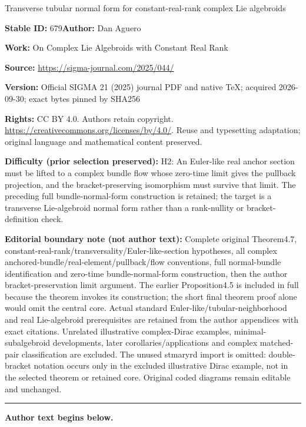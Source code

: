 \documentclass[11pt]{article}
\numberwithin{equation}{section}
\numberwithin{equation}{section}
\begin{document}
\begin{center}\Large Transverse tubular normal form for constant-real-rank complex Lie algebroids\end{center}
\noindent\textbf{Stable ID:} 679\quad\textbf{Author:} Dan Aguero\par
\noindent\textbf{Work:} On Complex Lie Algebroids with Constant Real Rank\par
\noindent\textbf{Source:} \url{https://sigma-journal.com/2025/044/}\par
\noindent\textbf{Version:} Official SIGMA 21 (2025) journal PDF and native TeX; acquired 2026-09-30; exact bytes pinned by SHA256\par
\noindent\textbf{Rights:} CC BY 4.0. Authors retain copyright. \url{https://creativecommons.org/licenses/by/4.0/}. Reuse and typesetting adaptation; original language and mathematical content preserved.\par
\noindent\textbf{Difficulty (prior selection preserved):} {\CJKfont H2: An Euler-like real anchor section must be lifted to a complex bundle flow whose zero-time limit gives the pullback projection, and the bracket-preserving isomorphism must survive that limit. The preceding full bundle-normal-form construction is retained; the target is a transverse Lie-algebroid normal form rather than a rank-nullity or bracket-definition check.}\par
\medskip\noindent\textbf{Editorial boundary note (not author text):} Complete original Theorem4.7, constant-real-rank/transversality/Euler-like-section hypotheses, all complex anchored-bundle/real-element/pullback/flow conventions, full normal-bundle identification and zero-time bundle-normal-form construction, then the author bracket-preservation limit argument. The earlier Proposition4.5 is included in full because the theorem invokes its construction; the short final theorem proof alone would omit the central core. Actual standard Euler-like/tubular-neighborhood and real Lie-algebroid prerequisites are retained from the author appendices with exact citations. Unrelated illustrative complex-Dirac examples, minimal-subalgebroid developments, later corollaries/applications and complex matched-pair classification are excluded. The unused stmaryrd import is omitted: double-bracket notation occurs only in the excluded illustrative Dirac example, not in the selected theorem or retained core. Original coded diagrams remain editable and unchanged.\par
\medskip\hrule\medskip\noindent\textbf{Author text begins below.}\par
\setcounter{section}{1}
\end{document}
